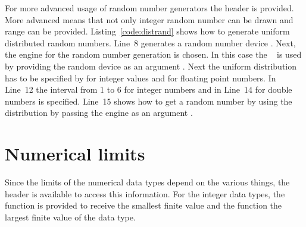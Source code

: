 

For more advanced usage of random number generators the  header is provided. More advanced means that not only integer random number can be drawn and range can be provided. Listing~\ref{code:distrand} shows how to generate uniform distributed random numbers. Line~8 generates a random number device . Next, the engine for the random number generation is chosen. In this case the ~\cite{matsumoto1998mersenne} is used by providing the random device as an argument . Next the uniform distribution has to be specified by  for integer values and  for floating point numbers. In Line~12 the interval from 1 to 6 for integer numbers and in Line~14 for double numbers is specified. Line~15 shows how to get a random number by using the distribution by passing the engine as an argument .



\section{Numerical limits}
Since the limits of the numerical data types depend on the various things, the  header is available to access this information. For the integer data types, the function  is provided to receive the smallest finite value and the function  the largest finite value of the  data type.\\

